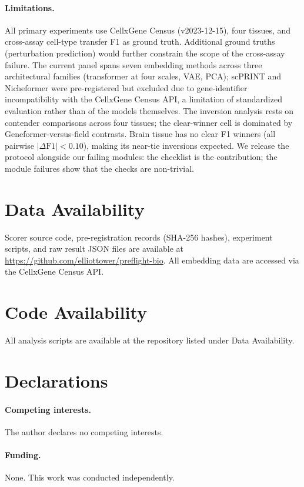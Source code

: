 \documentclass[11pt]{article}
\begin{document}
\paragraph{Limitations.} All primary experiments use CellxGene Census (v2023-12-15), four tissues, and cross-assay cell-type transfer F1 as ground truth. Additional ground truths (perturbation prediction) would further constrain the scope of the cross-assay failure. The current panel spans seven embedding methods across three architectural families (transformer at four scales, VAE, PCA); scPRINT and Nicheformer were pre-registered but excluded due to gene-identifier incompatibility with the CellxGene Census API, a limitation of standardized evaluation rather than of the models themselves. The inversion analysis rests on contender comparisons across four tissues; the clear-winner cell is dominated by Geneformer-versus-field contrasts. Brain tissue has no clear F1 winners (all pairwise $|\Delta\text{F1}| < 0.10$), making its near-tie inversions expected. We release the protocol alongside our failing modules: the checklist is the contribution; the module failures show that the checks are non-trivial.

\section*{Data Availability}

Scorer source code, pre-registration records (SHA-256 hashes), experiment scripts, and raw result JSON files are available at \url{https://github.com/elliottower/preflight-bio}. All embedding data are accessed via the CellxGene Census API.

\section*{Code Availability}

All analysis scripts are available at the repository listed under Data Availability.

\section*{Declarations}

\paragraph{Competing interests.} The author declares no competing interests.

\paragraph{Funding.} None. This work was conducted independently.
\end{document}
